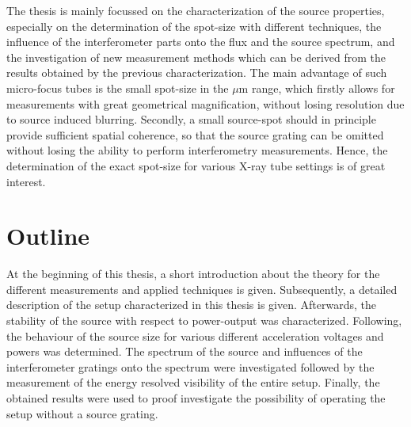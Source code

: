 The thesis is mainly focussed on the characterization of the source properties, especially on the determination of the spot-size with different techniques, the influence of the interferometer parts onto the flux and the source spectrum, and the investigation of new measurement methods which can be derived from the results obtained by the previous characterization. The main advantage of such micro-focus tubes is the small spot-size in the $\mu$m range, which firstly allows for measurements with great geometrical magnification, without losing resolution due to source induced blurring. Secondly, a small source-spot should in principle provide sufficient spatial coherence, so that the source grating can be omitted without losing the ability to perform interferometry measurements. Hence, the determination of the exact spot-size for various X-ray tube settings is of great interest.

\section{Outline}
At the beginning of this thesis, a short introduction about the theory for the different measurements and applied techniques is given. Subsequently, a detailed description of the setup characterized in this thesis is given. Afterwards, the stability of the source with respect to power-output was characterized. Following, the behaviour of the source size for various different acceleration voltages and powers was determined. The spectrum of the source and influences of the interferometer gratings onto the spectrum were investigated followed by the measurement of the energy resolved visibility of the entire setup. Finally, the obtained results were used to proof investigate the possibility of operating the setup without a source grating.
              














